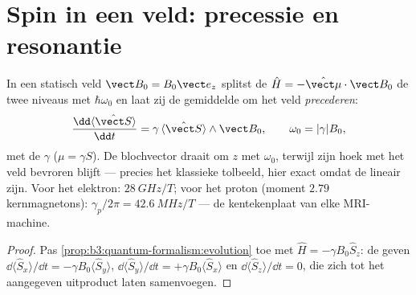 \section{Spin in een veld: precessie en resonantie}

\begin{proposition}[Larmorprecessie]\label{prop:b3:spin-two-level:larmor}
In een statisch veld $\vect B_0 = B_0\vect e_z$ splitst de 
$\hat
H = -\hat{\vect\mu}\cdot\vect B_0$ de twee niveaus met
$\hbar\omega_0$ en laat zij de gemiddelde  om het veld
\emph{precederen}:
\[
\frac{\dd\langle\hat{\vect S}\rangle}{\dd t} =
\gamma\,\langle\hat{\vect S}\rangle\wedge\vect B_0 , \qquad
\omega_0 = |\gamma|B_0 ,
\]
met de  $\gamma$ ($\mu = \gamma S$). De
blochvector draait om $z$ met $\omega_0$, terwijl zijn hoek met het veld
bevroren blijft --- precies het klassieke tolbeeld, hier exact omdat de
 lineair zijn. Voor het elektron: $\qty{28}{GHz/T}$; voor het
proton (moment $2.79$ kernmagnetons): $\gamma_p/2\pi =
\qty{42.6}{MHz/T}$
--- de kentekenplaat van elke MRI-machine.
\end{proposition}

\begin{proof}
Pas \cref{prop:b3:quantum-formalism:evolution} toe met $\hat H =
-\gamma B_0\hat S_z$: de  geven $\dd\langle\hat
S_x\rangle/\dd t = -\gamma B_0\langle\hat S_y\rangle$,
$\dd\langle\hat S_y\rangle/\dd t = +\gamma B_0\langle\hat
S_x\rangle$ en $\dd\langle\hat S_z\rangle/\dd t = 0$, die zich tot het
aangegeven uitproduct laten samenvoegen.
\end{proof}

